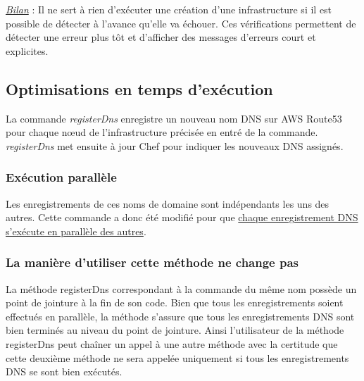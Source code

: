 \underline{\textit{Bilan}} :  Il ne sert à rien d'exécuter une création d'une
infrastructure si il est possible de détecter à l'avance qu'elle va échouer.  
Ces vérifications permettent de détecter une erreur plus tôt et d'afficher des
messages d'erreurs court et explicites.





\subsection{Optimisations en temps d'exécution}

La commande \textit{registerDns} enregistre un nouveau nom DNS sur AWS Route53
pour chaque nœud de l'infrastructure précisée en entré de la
commande. \textit{registerDns} met ensuite à jour Chef pour indiquer les
nouveaux DNS assignés.

\subsubsection{Exécution parallèle}

Les enregistrements de ces noms de domaine sont indépendants les uns des autres.
Cette commande a donc été modifié pour que \underline{chaque enregistrement DNS
  s'exécute en parallèle des autres}.

\subsubsection{La manière d'utiliser cette méthode ne change pas}

La méthode registerDns correspondant à la commande du même nom possède un point
de jointure à la fin de son code. Bien que tous les enregistrements soient
effectués en parallèle, la méthode s'assure que tous les enregistrements DNS
sont bien terminés au niveau du point de jointure. 
Ainsi l'utilisateur de la méthode registerDns peut chaîner un appel à une autre
méthode avec la certitude que cette deuxième méthode ne sera appelée uniquement
si tous les enregistrements DNS se sont bien exécutés.


